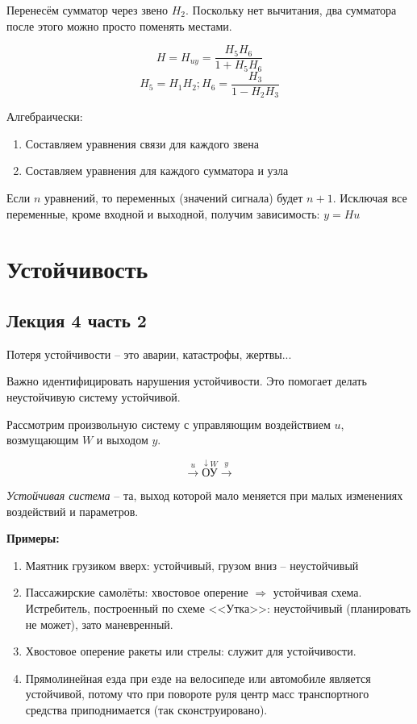 \documentclass[main.tex]{subfiles}
\begin{document}

Перенесём сумматор через звено $ H_2 $.
Поскольку нет вычитания, два сумматора после этого можно просто поменять местами.


$$ H = H_{uy} = \frac{H_5 H_6}{1 + H_5 H_6} $$
$$ H_5 = H_1 H_2; H_6 = \frac{H_3}{1 - H_2 H_3} $$

Алгебраически:
\begin{enumerate}[noitemsep]
    \item Составляем уравнения связи для каждого звена
    \item Составляем уравнения для каждого сумматора и узла
\end{enumerate}

Если $ n $ уравнений, то переменных (значений сигнала) будет $ n + 1 $.
Исключая все переменные, кроме входной и выходной, получим зависимость: $ y = Hu $


\chapter{Устойчивость}

\section{Лекция 4 часть 2}

Потеря устойчивости -- это аварии, катастрофы, жертвы...

Важно идентифицировать нарушения устойчивости.
Это помогает делать неустойчивую систему устойчивой.

Рассмотрим произвольную систему с управляющим воздействием $u$, возмущающим $W$ и выходом $y$.

$$ \xrightarrow{u} \overset{\downarrow W}{\boxed{\text{ОУ}}} \xrightarrow{y} $$

\emph{Устойчивая система} -- та, выход которой мало меняется при малых изменениях воздействий и параметров.

\textbf{Примеры:}
\begin{enumerate}
    \item Маятник грузиком вверх: устойчивый, грузом вниз -- неустойчивый
    \item Пассажирские самолёты: хвостовое оперение $ \Rightarrow $ устойчивая схема.
    Истребитель, построенный по схеме <<Утка>>: неустойчивый (планировать не может), зато маневренный.
    \item Хвостовое оперение ракеты или стрелы: служит для устойчивости.
    \item Прямолинейная езда при езде на велосипеде или автомобиле является устойчивой, потому что при повороте руля центр масс транспортного средства приподнимается (так сконструировано).
\end{enumerate}
\end{document}
